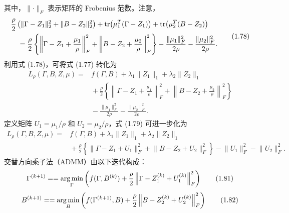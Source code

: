 其中，$\lVert\cdot\rVert_F$ 表示矩阵的 Frobenius 范数。注意，
\begin{equation}
 \begin{aligned}
 &\frac\rho2\left(\lVert\Gamma-Z_1\rVert_2^2
                       +\lVert B-Z_2\rVert_2^2\right)
  +\operatorname{tr}\bigl(\mu_1^{T}(\Gamma-Z_1)\bigr)
  +\operatorname{tr}\bigl(\mu_2^{T}(B-Z_2)\bigr)\\
 &\quad=\frac\rho2\left\{
     \left\lVert\Gamma-Z_1+\frac{\mu_1}\rho\right\rVert_F^2
    +\left\lVert B-Z_2+\frac{\mu_2}\rho\right\rVert_F^2\right\}
    -\frac{\lVert\mu_1\rVert_F^2}{2\rho}
    -\frac{\lVert\mu_2\rVert_F^2}{2\rho}.
 \end{aligned}
 \tag{1.78}
\end{equation}
利用式 (1.78)，可将式 (1.77) 转化为
\begin{equation}
 \begin{aligned}
 L_\rho(\Gamma,B,Z,\mu)
 ={}&f(\Gamma,B)+\lambda_1\lVert Z_1\rVert_1+\lambda_2\lVert Z_2\rVert_1\\
 &{}+\frac\rho2\left\{
     \left\lVert\Gamma-Z_1+\frac{\mu_1}\rho\right\rVert_F^2
    +\left\lVert B-Z_2+\frac{\mu_2}\rho\right\rVert_F^2\right\}\\
 &{}-\frac{\lVert\mu_1\rVert_F^2}{2\rho}
      -\frac{\lVert\mu_2\rVert_F^2}{2\rho}.
 \end{aligned}
 \tag{1.79}
\end{equation}
定义矩阵 $U_1=\mu_1/\rho$ 和 $U_2=\mu_2/\rho$，式 (1.79) 可进一步化为
\begin{equation}
 \begin{aligned}
 L_\rho(\Gamma,B,Z,\mu)
 ={}&f(\Gamma,B)+\lambda_1\lVert Z_1\rVert_1+\lambda_2\lVert Z_2\rVert_1\\
 &{}+\frac\rho2\left\{\lVert\Gamma-Z_1+U_1\rVert_F^2
                       +\lVert B-Z_2+U_2\rVert_F^2\right\}
       -\lVert U_1\rVert_F^2-\lVert U_2\rVert_F^2.
 \end{aligned}
 \tag{1.80}
\end{equation}
交替方向乘子法（ADMM）由以下迭代构成：
\begin{equation}
 \Gamma^{(k+1)}\mathrel{==}\operatorname*{arg\,min}_\Gamma
 \left(f(\Gamma,B^{(k)})
       +\frac\rho2\left\lVert\Gamma-Z_1^{(k)}+U_1^{(k)}\right\rVert_F^2\right)
 \tag{1.81}
\end{equation}
\begin{equation}
 B^{(k+1)}\mathrel{==}\operatorname*{arg\,min}_B
 \left(f(\Gamma^{(k+1)},B)
       +\frac\rho2\left\lVert B-Z_2^{(k)}+U_2^{(k)}\right\rVert_F^2\right)
 \tag{1.82}
\end{equation}
